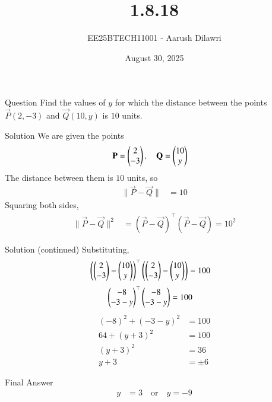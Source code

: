 \documentclass{beamer}
\title{1.8.18}
\date{August 30, 2025}
\author{EE25BTECH11001 - Aarush Dilawri}
\begin{document}
\begin{frame}
  \titlepage
\end{frame}

\begin{frame}{Question}
Find the values of $y$ for which the distance between the points 
$\vec{P}(2,-3)$ and $\vec{Q}(10,y)$ is $10$ units.
\end{frame}

\begin{frame}{Solution}
We are given the points
\begin{align*}
\mathbf{P} &= \begin{pmatrix}2\\-3\end{pmatrix}, \quad 
\mathbf{Q} = \begin{pmatrix}10\\y\end{pmatrix}
\end{align*}
The distance between them is $10$ units, so
\begin{align*}
\|\vec{P}-\vec{Q}\| &= 10
\end{align*}
Squaring both sides,
\begin{align*}
\|\vec{P}-\vec{Q}\|^2 &= (\vec{P}-\vec{Q})^\top(\vec{P}-\vec{Q}) = 10^2
\end{align*}
\end{frame}

\begin{frame}{Solution (continued)}
Substituting,
\begin{align*}
\left( \begin{pmatrix}2\\-3\end{pmatrix} - \begin{pmatrix}10\\y\end{pmatrix} \right)^\top
\left( \begin{pmatrix}2\\-3\end{pmatrix} - \begin{pmatrix}10\\y\end{pmatrix} \right) &= 100
\end{align*}
\begin{align*}
\begin{pmatrix}-8\\-3-y\end{pmatrix}^\top \begin{pmatrix}-8\\-3-y\end{pmatrix} &= 100
\end{align*}
\begin{align*}
(-8)^2 + (-3-y)^2 &= 100 \\
64 + (y+3)^2 &= 100 \\
(y+3)^2 &= 36 \\
y+3 &= \pm 6
\end{align*}
\end{frame}

\begin{frame}{Final Answer}
\begin{align*}
y &= 3 \quad \text{or} \quad y = -9
\end{align*}
\end{frame}
\end{document}
